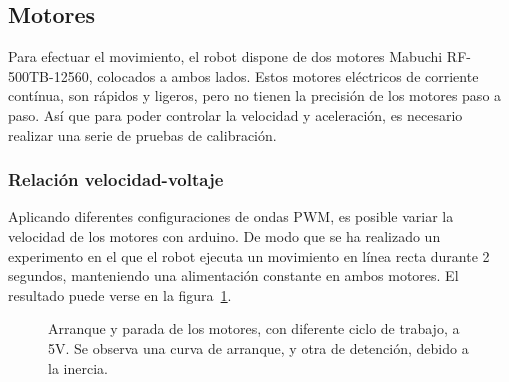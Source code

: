 \documentclass[10pt,a4paper,hidelinks,twocolumn]{article}
\begin{document}
\subsection{Motores}
Para efectuar el movimiento, el robot dispone de dos motores Mabuchi 
RF-500TB-12560, colocados a ambos lados. Estos motores eléctricos de corriente 
contínua, son rápidos y ligeros, pero no tienen la precisión de los motores paso 
a paso. Así que para poder controlar la velocidad y aceleración, es necesario 
realizar una serie de pruebas de calibración.

\subsubsection{Relación velocidad-voltaje}
Aplicando diferentes configuraciones de ondas PWM, es posible variar la 
velocidad de los motores con arduino. De modo que se ha realizado un experimento 
en el que el robot ejecuta un movimiento en línea recta durante 2 segundos, 
manteniendo una alimentación constante en ambos motores. El resultado puede 
verse en la figura~\ref{fig:velocidad-voltaje}.

\begin{figure}[h]
\centering
{}
\caption{Arranque y parada de los motores, con diferente ciclo de trabajo, a 5V.  
Se observa una curva de arranque, y otra de detención, debido a la inercia.
\label{fig:velocidad-voltaje}}
\end{figure}
\end{document}
